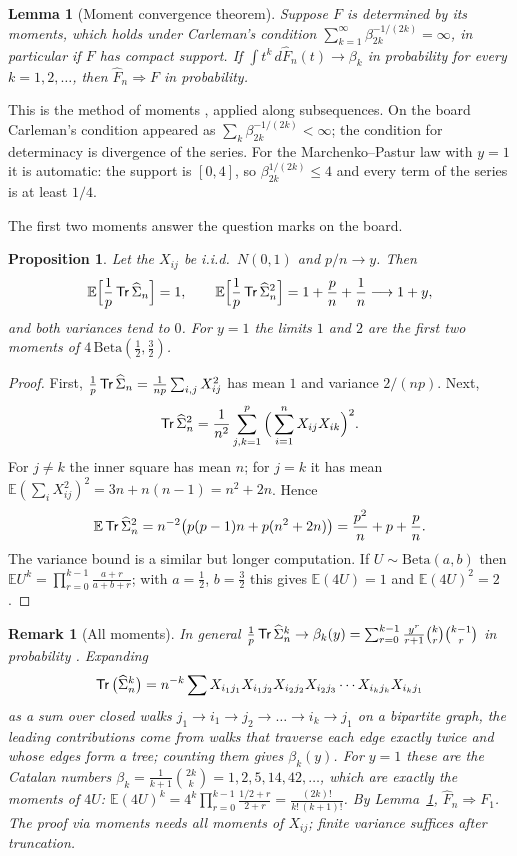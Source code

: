 \documentclass[11pt]{article}
\newtheorem{lemma}{Lemma}
\newtheorem{proposition}{Proposition}
\newtheorem{remark}{Remark}
\newcommand{\wh}{\widehat}
\newcommand{\Expect}{\mathbb{E}}
\newcommand{\Tr}{\mathop{\sf Tr}}
\begin{document}
\begin{lemma}[Moment convergence theorem]\label{lmm:moments}
Suppose $F$ is determined by its moments, which holds under Carleman's condition $\sum_{k=1}^\infty\beta_{2k}^{-1/(2k)}=\infty$, in particular if $F$ has compact support. If $\int t^k\,d\wh F_n(t)\to\beta_k$ in probability for every $k=1,2,\dots$, then $\wh F_n\Rightarrow F$ in probability.
\end{lemma}

This is the method of moments \citep[Thm.~30.2]{Bil95}, applied along subsequences. On the board Carleman's condition appeared as $\sum_k\beta_{2k}^{-1/(2k)}<\infty$; the condition for determinacy is divergence of the series. For the Marchenko--Pastur law with $y=1$ it is automatic: the support is $[0,4]$, so $\beta_{2k}^{1/(2k)}\le4$ and every term of the series is at least $1/4$.

The first two moments answer the question marks on the board.

\begin{proposition}\label{prop:twomoments}
Let the $X_{ij}$ be i.i.d.\ $N(0,1)$ and $p/n\to y$. Then
\[
\Expect\Big[\frac1p\Tr\wh\Sigma_n\Big]=1,\qquad
\Expect\Big[\frac1p\Tr\wh\Sigma_n^2\Big]=1+\frac pn+\frac1n\longrightarrow1+y,
\]
and both variances tend to $0$. For $y=1$ the limits $1$ and $2$ are the first two moments of $4\,\mathrm{Beta}(\frac12,\frac32)$.
\end{proposition}

\begin{proof}
First, $\frac1p\Tr\wh\Sigma_n=\frac1{np}\sum_{i,j}X_{ij}^2$ has mean $1$ and variance $2/(np)$. Next,
\[
\Tr\wh\Sigma_n^2=\frac1{n^2}\sum_{j,k=1}^p\Big(\sum_{i=1}^nX_{ij}X_{ik}\Big)^2 .
\]
For $j\ne k$ the inner square has mean $n$; for $j=k$ it has mean $\Expect(\sum_iX_{ij}^2)^2=3n+n(n-1)=n^2+2n$. Hence
\[
\Expect\Tr\wh\Sigma_n^2=n^{-2}\big(p(p-1)n+p(n^2+2n)\big)=\frac{p^2}n+p+\frac pn .
\]
The variance bound is a similar but longer computation. If $U\sim\mathrm{Beta}(a,b)$ then $\Expect U^k=\prod_{r=0}^{k-1}\frac{a+r}{a+b+r}$; with $a=\frac12$, $b=\frac32$ this gives $\Expect(4U)=1$ and $\Expect(4U)^2=2$.
\end{proof}

\begin{remark}[All moments]
In general $\frac1p\Tr\wh\Sigma_n^k\to\beta_k(y)=\sum_{r=0}^{k-1}\frac{y^r}{r+1}\binom kr\binom{k-1}r$ in probability \citep[Sec.~3.1]{BS10}. Expanding
\[
\Tr\big(\wh\Sigma_n^k\big)=n^{-k}\sum X_{i_1j_1}X_{i_1j_2}X_{i_2j_2}X_{i_2j_3}\cdots X_{i_kj_k}X_{i_kj_1}
\]
as a sum over closed walks $j_1\to i_1\to j_2\to\dots\to i_k\to j_1$ on a bipartite graph, the leading contributions come from walks that traverse each edge exactly twice and whose edges form a tree; counting them gives $\beta_k(y)$. For $y=1$ these are the Catalan numbers $\beta_k=\frac1{k+1}\binom{2k}k=1,2,5,14,42,\dots$, which are exactly the moments of $4U$: $\Expect(4U)^k=4^k\prod_{r=0}^{k-1}\frac{1/2+r}{2+r}=\frac{(2k)!}{k!\,(k+1)!}$. By Lemma~\ref{lmm:moments}, $\wh F_n\Rightarrow F_1$. The proof via moments needs all moments of $X_{ij}$; finite variance suffices after truncation.
\end{remark}
\end{document}
